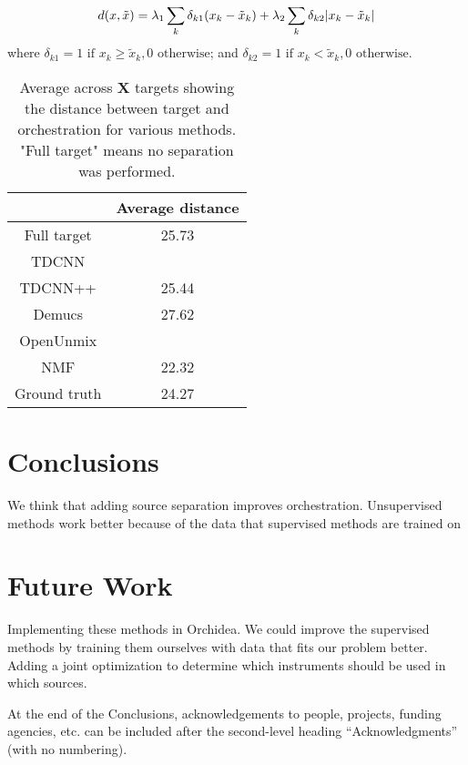 \documentclass{article}
\begin{document}
		\begin{equation}\label{eqn:distance}
d(x, \tilde{x}) =\lambda_1 \sum_k \delta_{k1}(x_k - \tilde{x}_k) + \lambda_2 \sum_k \delta_{k2}|x_k - \tilde{x	}_k| \\
\end{equation}
where $\delta_{k1} = 1 \text{  if  } x_k \ge \tilde{x}_k, 0 \text{  otherwise}$; and $\delta_{k2} = 1 \text{  if  } x_k < \tilde{x}_k, 0 \text{  otherwise}$.
	
	
	\begin{table}[t]
		\begin{center}
			\begin{tabular}{|c|c|}
				\hline
				& Average distance \\
				\hline
				Full target & 25.73 \\
				\hline
				TDCNN & \\
				\hline
				TDCNN++ & 25.44 \\
				\hline
				Demucs & 27.62 \\
				\hline
				OpenUnmix & \\
				\hline
				NMF & 22.32 \\
				\hline
				Ground truth & 24.27 \\
				\hline
			\end{tabular}
		\end{center}
		\caption{Average across \textbf{X} targets showing the distance between target and orchestration for various methods. "Full target" means no separation was performed. }
		\label{tab:distances}
	\end{table}
	
	\section{Conclusions}\label{sec:conclusions}
	We think that adding source separation improves orchestration. Unsupervised methods work better because of the data that supervised methods are trained on
	
	\section{Future Work}\label{sec:futurework}
	Implementing these methods in Orchidea. We could improve the supervised methods by training them ourselves with data that fits our problem better. Adding a joint optimization to determine which instruments should be used in which sources.
	
	\begin{acknowledgments}
		At the end of the Conclusions, acknowledgements to people, projects, funding agencies, etc. can be included after the second-level heading  ``Acknowledgments'' (with no numbering).
	\end{acknowledgments} 
	
	
	
\end{document}
